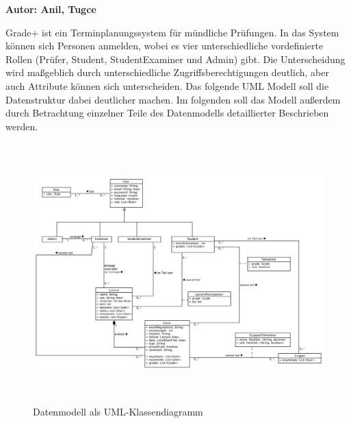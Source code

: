 \textbf{Autor: Anil, Tugce}

\glqq{}Grade+\grqq{} ist ein Terminplanungssystem für mündliche Prüfungen. In das System können sich Personen anmelden, wobei es vier unterschiedliche vordefinierte Rollen (Prüfer, Student, StudentExaminer und Admin) gibt. Die Unterscheidung wird maßgeblich durch unterschiedliche Zugriffsberechtigungen deutlich, aber auch Attribute können sich unterscheiden. Das folgende UML Modell soll die Datenstruktur dabei deutlicher machen. Im folgenden soll das Modell außerdem durch Betrachtung einzelner Teile des Datenmodells detaillierter Beschrieben werden.
\begin{figure}[H]
	\centering
  \includegraphics[width=\textwidth,height=10cm,keepaspectratio]{../UMLDiagramme/datenmodell/alles.png}
	\caption{Datenmodell als UML-Klassendiagramm}
	\label{fig 0}
\end{figure}


